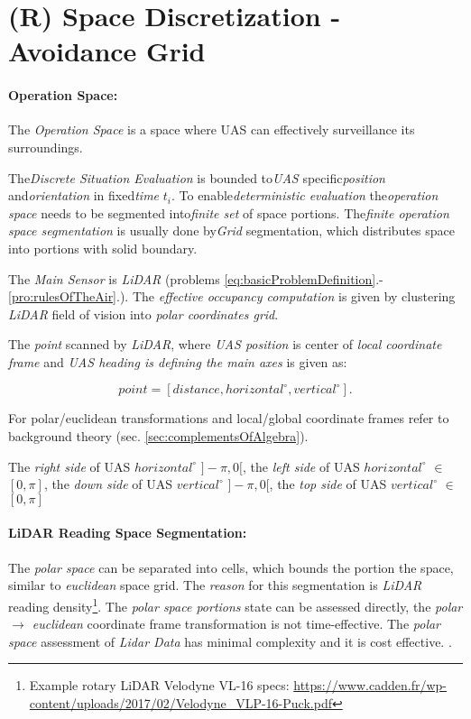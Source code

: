 \section{(R) Space Discretization - Avoidance Grid}\label{s:AvoidanceGrid}

\paragraph{Operation Space:} The \emph{Operation Space} is a space where UAS can effectively surveillance its surroundings.

The\emph{Discrete Situation Evaluation} is bounded to\emph{UAS} specific\emph{position} and\emph{orientation} in fixed\emph{time} $t_i$. To enable\emph{deterministic evaluation} the\emph{operation space} needs to be segmented into\emph{finite set} of space portions. The\emph{finite operation space segmentation} is usually done by\emph{Grid} segmentation, which distributes space into portions with solid boundary.

The \emph{Main Sensor} is \emph{LiDAR} (problems \ref{eq:basicProblemDefinition}.-\ref{pro:rulesOfTheAir}.). The \emph{effective occupancy computation} \cite{homm2010efficient} is given by clustering \emph{LiDAR} field of vision into \emph{polar coordinates grid}.

The \emph{point} scanned by \emph{LiDAR}, where \emph{UAS position} is center of \emph{local coordinate frame} and \emph{UAS heading is defining the main axes} is given as:

\begin{equation*}
    point = [distance,horizontal^\circ,vertical^\circ].
\end{equation*}

\begin{note}
    For polar/euclidean transformations and local/global coordinate frames refer to background theory (sec. \ref{sec:complementsOfAlgebra}). 
    
    The \emph{right side} of UAS $horizontal^\circ$ $]-\pi,0[$, the \emph{left side} of UAS $horizontal^\circ$ $\in$ $[0,\pi]$, the \emph{down side} of UAS $vertical^\circ$ $]-\pi,0[$, the \emph{top side} of UAS $vertical^\circ$ $\in$ $[0,\pi]$
\end{note}

\paragraph{LiDAR Reading Space Segmentation:} The \emph{polar space} can be separated into cells, which bounds the portion the space, similar to \emph{euclidean} space grid. The \emph{reason} for this segmentation is \emph{LiDAR} reading density\footnote{Example rotary LiDAR Velodyne VL-16 specs: \url{https://www.cadden.fr/wp-content/uploads/2017/02/Velodyne_VLP-16-Puck.pdf}}. The \emph{polar space portions} state can be assessed directly, the \emph{polar $\to$ euclidean} coordinate frame transformation is not time-effective. The \emph{polar space} assessment of \emph{Lidar Data} has minimal complexity and it is cost effective. \cite{gupta2010comparative}.

